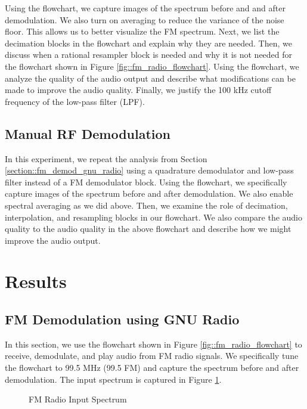\documentclass{article}
\begin{document}
\noindent Using the flowchart, we capture images of the spectrum before and and after demodulation. We also turn on averaging to reduce the variance of the noise floor. This allows us to better visualize the FM spectrum. Next, we list the decimation blocks in the flowchart and explain why they are needed. Then, we discuss when a rational resampler block is needed and why it is not needed for the flowchart shown in Figure \ref{fig::fm_radio_flowchart}. Using the flowchart, we analyze the quality of the audio output and describe what modifications can be made to improve the audio quality. Finally, we justify the 100 kHz cutoff frequency of the low-pass filter (LPF).

\subsection{Manual RF Demodulation}

In this experiment, we repeat the analysis from Section \ref{section::fm_demod_gnu_radio} using a quadrature demodulator and low-pass filter instead of a FM demodulator block. Using the flowchart, we specifically capture images of the spectrum before and after demodulation. We also enable spectral averaging as we did above. Then, we examine the role of decimation, interpolation, and resampling blocks in our flowchart. We also compare the audio quality to the audio quality in the above flowchart and describe how we might improve the audio output.

\section{Results}

\subsection{FM Demodulation using GNU Radio}

In this section, we use the flowchart shown in Figure \ref{fig::fm_radio_flowchart} to receive, demodulate, and play audio from FM radio signals. We specifically tune the flowchart to 99.5 MHz (99.5 FM) and capture the spectrum before and after demodulation. The input spectrum is captured in Figure \ref{fig::fm_radio_input_spectrum}.

\begin{figure}[H]
	\centerline{}
	\caption{FM Radio Input Spectrum}
	\label{fig::fm_radio_input_spectrum}
\end{figure}
\end{document}
